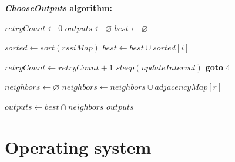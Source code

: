 \documentclass[conference]{IEEEtran}
\begin{document}
\vspace{0.3cm}
\textbf{\textit{ChooseOutputs} algorithm:}
\begin{algorithmic}[1]
\STATE $retryCount \gets 0$
\STATE $outputs \gets \varnothing$
\STATE $best \gets \varnothing$

\STATE $sorted \gets sort(rssiMap)$
	\STATE $best \gets best \cup sorted[i]$
\ENDFOR

	\STATE $retryCount \gets retryCount + 1$
	\STATE $sleep(updateInterval)$
	\STATE \textbf{goto} 4
\ENDIF

\STATE $neighbors \gets \varnothing$
	\STATE $neighbors \gets neighbors \cup adjacencyMap[r]$
\ENDFOR

\STATE $outputs \gets best \cap neighbors$
\RETURN $outputs$
\end{algorithmic}



\section{Operating system}
\end{document}
